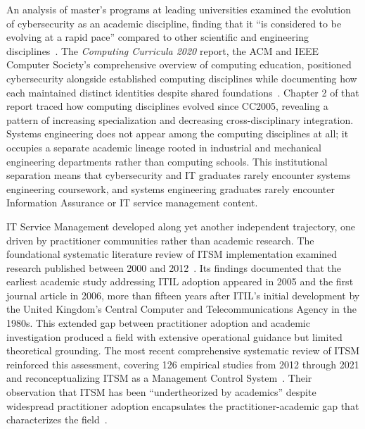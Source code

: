 An analysis of master's programs at leading universities examined the evolution of cybersecurity as an academic discipline, finding that it ``is considered to be evolving at a rapid pace'' compared to other scientific and engineering disciplines~\parencite{Cabaj_2018}. The \textit{Computing Curricula 2020} report, the ACM and IEEE Computer Society's comprehensive overview of computing education, positioned cybersecurity alongside established computing disciplines while documenting how each maintained distinct identities despite shared foundations~\parencite{CC2020}. Chapter 2 of that report traced how computing disciplines evolved since CC2005, revealing a pattern of increasing specialization and decreasing cross-disciplinary integration. Systems engineering does not appear among the computing disciplines at all; it occupies a separate academic lineage rooted in industrial and mechanical engineering departments rather than computing schools. This institutional separation means that cybersecurity and IT graduates rarely encounter systems engineering coursework, and systems engineering graduates rarely encounter Information Assurance or IT service management content.

IT Service Management developed along yet another independent trajectory, one driven by practitioner communities rather than academic research. The foundational systematic literature review of ITSM implementation examined research published between 2000 and 2012~\parencite{Iden_2013}. Its findings documented that the earliest academic study addressing ITIL adoption appeared in 2005 and the first journal article in 2006, more than fifteen years after ITIL's initial development by the United Kingdom's Central Computer and Telecommunications Agency in the 1980s. This extended gap between practitioner adoption and academic investigation produced a field with extensive operational guidance but limited theoretical grounding. The most recent comprehensive systematic review of ITSM reinforced this assessment, covering 126 empirical studies from 2012 through 2021 and reconceptualizing ITSM as a Management Control System~\parencite{MacLean_2023}. Their observation that ITSM has been ``undertheorized by academics'' despite widespread practitioner adoption encapsulates the practitioner-academic gap that characterizes the field~\parencite{MacLean_2023}.

